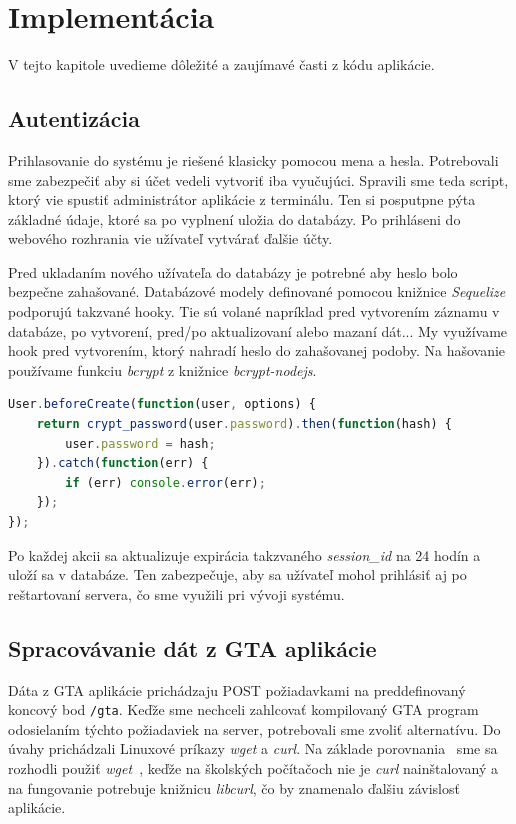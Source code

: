\chapter{Implementácia}
\label{kap:implementacia}

V tejto kapitole uvedieme dôležité a zaujímavé časti z kódu aplikácie. 

\section{Autentizácia}
\label{sec:authentication}

Prihlasovanie do systému je riešené klasicky pomocou mena a hesla. Potrebovali sme
zabezpečiť aby si účet vedeli vytvoriť iba vyučujúci. Spravili sme teda script, ktorý
vie spustiť administrátor aplikácie z terminálu. Ten si posputpne pýta základné údaje,
ktoré sa po vyplnení uložia do databázy. Po prihláseni do webového rozhrania vie
užívateľ vytvárať ďalšie účty.

Pred ukladaním nového užívateľa do databázy je potrebné aby heslo bolo
bezpečne zahašované.  Databázové modely definované pomocou knižnice
\textit{Sequelize} podporujú takzvané hooky. Tie sú volané napríklad
pred vytvorením záznamu v databáze, po vytvorení, pred/po aktualizovaní alebo
mazaní dát... My využívame hook pred vytvorením, ktorý nahradí heslo do zahašovanej
podoby. Na hašovanie používame funkciu \textit{bcrypt} z knižnice
\textit{bcrypt-nodejs}.

\begin{lstlisting}[language=JavaScript]
User.beforeCreate(function(user, options) {
    return crypt_password(user.password).then(function(hash) {
        user.password = hash;
    }).catch(function(err) {
        if (err) console.error(err);
    });
});
\end{lstlisting}

Po každej akcii sa aktualizuje expirácia takzvaného \textit{session\_id} na 24 hodín
a uloží sa v databáze. Ten zabezpečuje, aby sa užívateľ mohol prihlásiť aj po
reštartovaní servera, čo sme využili pri vývoji systému.

\section{Spracovávanie dát z GTA aplikácie}
\label{sec:gtadataprocessing}

Dáta z GTA aplikácie prichádzaju POST požiadavkami na preddefinovaný
koncový bod \verb'/gta'.
Keďže sme nechceli zahlcovať kompilovaný GTA program odosielaním
týchto požiadaviek na server, potrebovali sme zvoliť alternatívu. Do úvahy prichádzali
Linuxové príkazy \textit{wget} a \textit{curl}. Na základe
porovnania~\cite{bib:curlwget} sme sa rozhodli použiť
\textit{wget}~\cite{bib:wgetmanual},
keďže na školských počítačoch nie je \textit{curl} nainštalovaný a na fungovanie
potrebuje knižnicu \textit{libcurl}, čo by znamenalo ďalšiu závislosť aplikácie.


